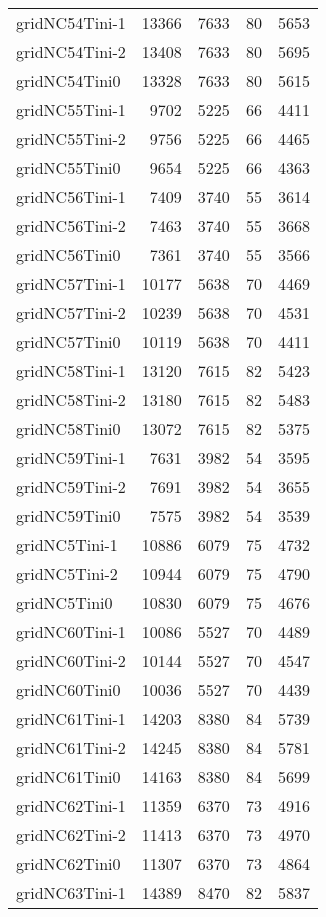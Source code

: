 \begin{longtable}{lrrrr}
gridNC54Tini-1 & 13366 & 7633 & 80 & 5653 \\
gridNC54Tini-2 & 13408 & 7633 & 80 & 5695 \\
gridNC54Tini0 & 13328 & 7633 & 80 & 5615 \\
gridNC55Tini-1 & 9702 & 5225 & 66 & 4411 \\
gridNC55Tini-2 & 9756 & 5225 & 66 & 4465 \\
gridNC55Tini0 & 9654 & 5225 & 66 & 4363 \\
gridNC56Tini-1 & 7409 & 3740 & 55 & 3614 \\
gridNC56Tini-2 & 7463 & 3740 & 55 & 3668 \\
gridNC56Tini0 & 7361 & 3740 & 55 & 3566 \\
gridNC57Tini-1 & 10177 & 5638 & 70 & 4469 \\
gridNC57Tini-2 & 10239 & 5638 & 70 & 4531 \\
gridNC57Tini0 & 10119 & 5638 & 70 & 4411 \\
gridNC58Tini-1 & 13120 & 7615 & 82 & 5423 \\
gridNC58Tini-2 & 13180 & 7615 & 82 & 5483 \\
gridNC58Tini0 & 13072 & 7615 & 82 & 5375 \\
gridNC59Tini-1 & 7631 & 3982 & 54 & 3595 \\
gridNC59Tini-2 & 7691 & 3982 & 54 & 3655 \\
gridNC59Tini0 & 7575 & 3982 & 54 & 3539 \\
gridNC5Tini-1 & 10886 & 6079 & 75 & 4732 \\
gridNC5Tini-2 & 10944 & 6079 & 75 & 4790 \\
gridNC5Tini0 & 10830 & 6079 & 75 & 4676 \\
gridNC60Tini-1 & 10086 & 5527 & 70 & 4489 \\
gridNC60Tini-2 & 10144 & 5527 & 70 & 4547 \\
gridNC60Tini0 & 10036 & 5527 & 70 & 4439 \\
gridNC61Tini-1 & 14203 & 8380 & 84 & 5739 \\
gridNC61Tini-2 & 14245 & 8380 & 84 & 5781 \\
gridNC61Tini0 & 14163 & 8380 & 84 & 5699 \\
gridNC62Tini-1 & 11359 & 6370 & 73 & 4916 \\
gridNC62Tini-2 & 11413 & 6370 & 73 & 4970 \\
gridNC62Tini0 & 11307 & 6370 & 73 & 4864 \\
gridNC63Tini-1 & 14389 & 8470 & 82 & 5837 \\

\end{longtable}
